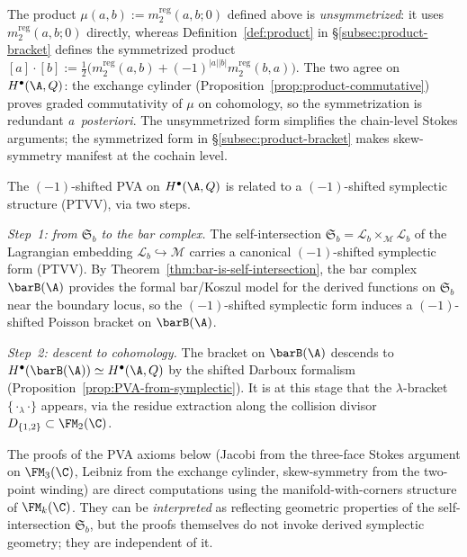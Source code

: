 \begin{remark}
\label{rem:unsymmetrized-product}
The product $\mu(a,b) := m_2^{\mathrm{reg}}(a,b;0)$ defined above is
\emph{unsymmetrized}: it uses $m_2^{\mathrm{reg}}(a,b;0)$ directly, whereas
Definition~\ref{def:product} in \S\ref{subsec:product-bracket} defines
the symmetrized product
$[a]\cdot[b] := \tfrac{1}{2}\bigl(m_2^{\mathrm{reg}}(a,b) +
(-1)^{|a||b|}m_2^{\mathrm{reg}}(b,a)\bigr)$.
The two agree on $H^\bullet(\A,Q)$: the exchange cylinder
(Proposition~\ref{prop:product-commutative}) proves graded commutativity of
$\mu$ on cohomology, so the symmetrization is redundant \emph{a~posteriori}.
The unsymmetrized form simplifies the chain-level
Stokes arguments; the symmetrized form in \S\ref{subsec:product-bracket}
makes skew-symmetry manifest at the cochain level.
\end{remark}

\begin{remark}
\label{rem:symplectic-origin-PVA}
The $(-1)$-shifted PVA on $H^\bullet(\A,Q)$ is
related to a $(-1)$-shifted symplectic structure (PTVV), via two steps.

\smallskip\noindent\emph{Step~1: from $\mathfrak{S}_b$ to the bar complex.}
The self-intersection
$\mathfrak{S}_b = \mathscr{L}_b \times_{\mathscr{M}} \mathscr{L}_b$ of the
Lagrangian embedding $\mathscr{L}_b \hookrightarrow \mathscr{M}$ carries a
canonical $(-1)$-shifted symplectic form (PTVV).
By Theorem~\ref{thm:bar-is-self-intersection}, the bar complex
$\barB(\A)$ provides the formal bar/Koszul model for the derived
functions on $\mathfrak{S}_b$ near the boundary locus, so the
$(-1)$-shifted symplectic form induces a $(-1)$-shifted Poisson
bracket on $\barB(\A)$.

\smallskip\noindent\emph{Step~2: descent to cohomology.}
The bracket on $\barB(\A)$ descends to $H^\bullet(\barB(\A))
\simeq H^\bullet(\A,Q)$ by the shifted Darboux formalism
(Proposition~\ref{prop:PVA-from-symplectic}). It is at this
stage that the $\lambda$-bracket
$\{{\cdot}_\lambda{\cdot}\}$ appears, via the residue extraction
along the collision divisor $D_{\{1,2\}} \subset \FM_2(\C)$.

\smallskip
The proofs of the PVA axioms below (Jacobi from the three-face
Stokes argument on $\FM_3(\C)$, Leibniz from the exchange cylinder,
skew-symmetry from the two-point winding) are direct
computations using the manifold-with-corners structure of
$\FM_k(\C)$. They can be \emph{interpreted} as reflecting
geometric properties of the self-intersection $\mathfrak{S}_b$,
but the proofs themselves do not invoke derived symplectic
geometry; they are independent of it.
\end{remark}

